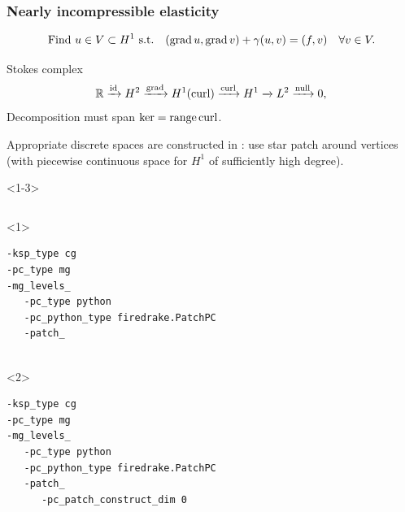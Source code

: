 \documentclass[presentation,aspectratio=43,10pt]{beamer}
\DeclareMathOperator{\grad}{grad}
\let\div\relax
\DeclareMathOperator{\div}{div}
\DeclareMathOperator{\curl}{curl}
\DeclareMathOperator{\range}{range}
\begin{document}
\begin{frame}[fragile]
  \frametitle{Nearly incompressible elasticity}
  \vspace*{-1.5\baselineskip}
  \begin{equation*}
    \text{Find $u \in V \subset H^1$ s.t.} \quad (\grad u, \grad v) + \gamma (\div u, \div v) = (f, v) \quad \forall v \in V.
  \end{equation*}
  \vspace*{-\baselineskip}
  \begin{block}{Stokes complex}
    \begin{equation*}
      \mathbb{R} \xrightarrow{\operatorname{id}} H^2 \xrightarrow{\grad} H^1(\curl)
      \xrightarrow{\curl} H^1 \xrightarrow{\div} L^2 \xrightarrow{\operatorname{null}} 0,
    \end{equation*}
    Decomposition must span $\ker \div = \range \curl$.

    Appropriate discrete spaces are constructed in \textcite{Neilan:2015a}: use
    star patch around vertices (with piecewise continuous space for
    $H^1$ of sufficiently high degree).
  \end{block}
  \begin{onlyenv}<1-3>
    \begin{columns}
      \begin{column}{0.6\textwidth}
        \begin{onlyenv}<1>
\begin{verbatim}
-ksp_type cg
-pc_type mg
-mg_levels_
   -pc_type python
   -pc_python_type firedrake.PatchPC
   -patch_


\end{verbatim}
        \end{onlyenv}
        \begin{onlyenv}<2>
\begin{verbatim}
-ksp_type cg
-pc_type mg
-mg_levels_
   -pc_type python
   -pc_python_type firedrake.PatchPC
   -patch_
      -pc_patch_construct_dim 0


\end{verbatim}
\end{onlyenv}
\end{column}
\end{columns}
\end{onlyenv}
\end{frame}
\end{document}
